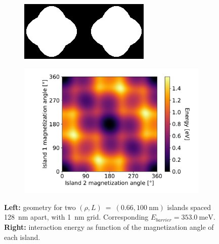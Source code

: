 \documentclass[11pt,a4paper,english]{article}
\begin{document}
\begin{figure}
    \centering
    \begin{subfigure}[c]{4cm} %
         \centering
         \includegraphics[width=\textwidth]{Figures/two_islands/Geometry/geom_r0.66_s100_d128_a0,0_cell1nm.png}
     \end{subfigure}
    \begin{subfigure}[c]{0.7\columnwidth}
         \centering
         \includegraphics[width=\textwidth]{Figures/two_islands/EnergyLandscape/Int_a0Pi,0Pi_d128_r0.66,0.66_cell1nm.pdf}
     \end{subfigure}
    \caption{\textbf{Left:} geometry for two $(\rho, L)~=~(0.66, \SI{100}{\nano\metre})$ islands spaced \SI{128}{\nano\metre} apart, with \SI{1}{\nano\metre} grid. Corresponding $E_{barrier}=\SI{353.0}{\milli\electronvolt}$. \textbf{Right:} interaction energy as function of the magnetization angle of each island.}
    \label{fig:two-islands_interaction_(r0.66_L100)_a0and0}
\end{figure}
\end{document}
